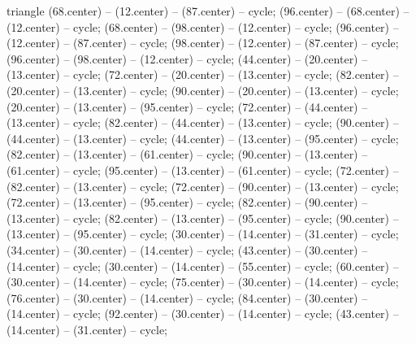 {\begin{pgfonlayer}{triangle}
 (68.center) -- (12.center) -- (87.center) -- cycle; 
 (96.center) -- (68.center) -- (12.center) -- cycle; 
 (68.center) -- (98.center) -- (12.center) -- cycle; 
 (96.center) -- (12.center) -- (87.center) -- cycle; 
 (98.center) -- (12.center) -- (87.center) -- cycle; 
 (96.center) -- (98.center) -- (12.center) -- cycle; 
 (44.center) -- (20.center) -- (13.center) -- cycle; 
 (72.center) -- (20.center) -- (13.center) -- cycle; 
 (82.center) -- (20.center) -- (13.center) -- cycle; 
 (90.center) -- (20.center) -- (13.center) -- cycle; 
 (20.center) -- (13.center) -- (95.center) -- cycle; 
 (72.center) -- (44.center) -- (13.center) -- cycle; 
 (82.center) -- (44.center) -- (13.center) -- cycle; 
 (90.center) -- (44.center) -- (13.center) -- cycle; 
 (44.center) -- (13.center) -- (95.center) -- cycle; 
 (82.center) -- (13.center) -- (61.center) -- cycle; 
 (90.center) -- (13.center) -- (61.center) -- cycle; 
 (95.center) -- (13.center) -- (61.center) -- cycle; 
 (72.center) -- (82.center) -- (13.center) -- cycle; 
 (72.center) -- (90.center) -- (13.center) -- cycle; 
 (72.center) -- (13.center) -- (95.center) -- cycle; 
 (82.center) -- (90.center) -- (13.center) -- cycle; 
 (82.center) -- (13.center) -- (95.center) -- cycle; 
 (90.center) -- (13.center) -- (95.center) -- cycle; 
 (30.center) -- (14.center) -- (31.center) -- cycle; 
 (34.center) -- (30.center) -- (14.center) -- cycle; 
 (43.center) -- (30.center) -- (14.center) -- cycle; 
 (30.center) -- (14.center) -- (55.center) -- cycle; 
 (60.center) -- (30.center) -- (14.center) -- cycle; 
 (75.center) -- (30.center) -- (14.center) -- cycle; 
 (76.center) -- (30.center) -- (14.center) -- cycle; 
 (84.center) -- (30.center) -- (14.center) -- cycle; 
 (92.center) -- (30.center) -- (14.center) -- cycle; 
 (43.center) -- (14.center) -- (31.center) -- cycle; 

\end{pgfonlayer}}
